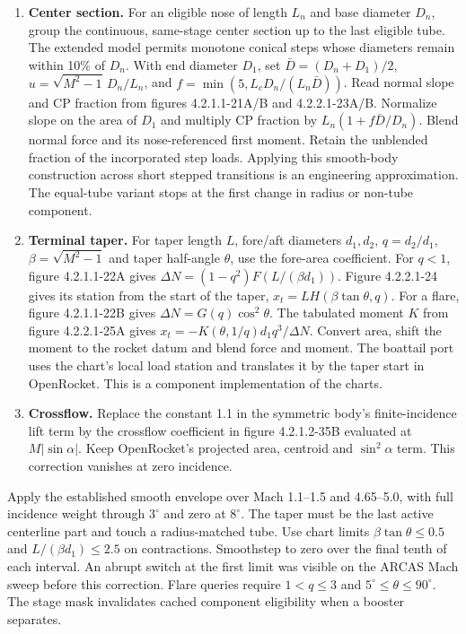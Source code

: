 \begin{enumerate}[leftmargin=*]
\item \textbf{Center section.} For an eligible nose of length $L_n$ and base diameter $D_n$, group the continuous, same-stage center section up to the last eligible tube. The extended model permits monotone conical steps whose diameters remain within 10\% of $D_n$. With end diameter $D_1$, set $\bar D=(D_n+D_1)/2$, $u=\sqrt{M^2-1}\,D_n/L_n$, and $f=\min(5,L_cD_n/(L_n\bar D))$. Read normal slope and CP fraction from figures 4.2.1.1-21A/B and 4.2.2.1-23A/B. Normalize slope on the area of $D_1$ and multiply CP fraction by $L_n(1+f\bar D/D_n)$. Blend normal force and its nose-referenced first moment. Retain the unblended fraction of the incorporated step loads. Applying this smooth-body construction across short stepped transitions is an engineering approximation. The equal-tube variant stops at the first change in radius or non-tube component.
\item \textbf{Terminal taper.} For taper length $L$, fore/aft diameters $d_1,d_2$, $q=d_2/d_1$, $\beta=\sqrt{M^2-1}$ and taper half-angle $\theta$, use the fore-area coefficient. For $q<1$, figure 4.2.1.1-22A gives $\Delta N=(1-q^2)F(L/(\beta d_1))$. Figure 4.2.2.1-24 gives its station from the start of the taper, $x_t=L H(\beta\tan\theta,q)$. For a flare, figure 4.2.1.1-22B gives $\Delta N=G(q)\cos^2\theta$. The tabulated moment $K$ from figure 4.2.2.1-25A gives $x_t=-K(\theta,1/q)d_1q^3/\Delta N$. Convert area, shift the moment to the rocket datum and blend force and moment. The boattail port uses the chart's local load station and translates it by the taper start in OpenRocket. This is a component implementation of the charts.
\item \textbf{Crossflow.} Replace the constant 1.1 in the symmetric body's finite-incidence lift term by the crossflow coefficient in figure 4.2.1.2-35B evaluated at $M|\sin\alpha|$. Keep OpenRocket's projected area, centroid and $\sin^2\alpha$ term. This correction vanishes at zero incidence.
\end{enumerate}

 Apply the established smooth envelope over Mach 1.1--1.5 and 4.65--5.0, with full incidence weight through $3^\circ$ and zero at $8^\circ$. The taper must be the last active centerline part and touch a radius-matched tube. Use chart limits $\beta\tan\theta\leq0.5$ and $L/(\beta d_1)\leq2.5$ on contractions. Smoothstep to zero over the final tenth of each interval. An abrupt switch at the first limit was visible on the ARCAS Mach sweep before this correction. Flare queries require $1<q\leq3$ and $5^\circ\leq\theta\leq90^\circ$. The stage mask invalidates cached component eligibility when a booster separates.

